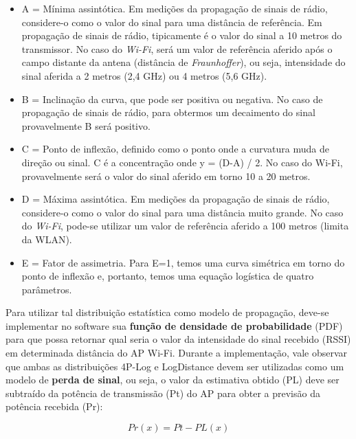 \documentclass[
	12pt,				%
	openright,			%
	twoside,			%
	a4paper,			%
	english,			%
	french,				%
	spanish,			%
	brazil				%
	]{abntex2}
\begin{document}
\begin{itemize}
	\item A = Mínima assintótica. Em medições da propagação de sinais de rádio, considere-o como o valor do sinal para uma distância de referência. Em propagação de sinais de rádio, tipicamente é o valor do sinal a 10 metros do transmissor. No caso do \textit{Wi-Fi}, será um valor de referência aferido após o campo distante da antena (distância de \textit{Fraunhoffer}), ou seja, intensidade do sinal aferida a 2 metros (2,4 GHz) ou 4 metros (5,6 GHz).
	
	\item B = Inclinação da curva, que pode ser positiva ou negativa. No caso de propagação de sinais de rádio, para obtermos um decaimento do sinal provavelmente B será positivo. 
	
	\item C = Ponto de inflexão, definido como o ponto onde a curvatura muda de direção ou sinal. C é a concentração onde y = (D-A) / 2. No caso do Wi-Fi, provavelmente será o valor do sinal aferido em torno 10 a 20 metros. 
	
	\item D = Máxima assintótica. Em medições da propagação de sinais de rádio, considere-o como o valor do sinal para uma distância muito grande. No caso do \textit{Wi-Fi}, pode-se utilizar um valor de referência aferido a 100 metros (limita da WLAN).
	
	\item E = Fator de assimetria. Para E=1, temos uma curva simétrica em torno do ponto de inflexão e, portanto, temos uma equação logística de quatro parâmetros.
	
\end{itemize}

Para utilizar tal distribuição estatística como modelo de propagação, deve-se implementar no software sua \textbf{função de densidade de probabilidade} (PDF) para que possa retornar qual seria o valor da intensidade do sinal recebido (RSSI) em determinada distância do AP Wi-Fi. Durante a implementação, vale observar que ambas as distribuições 4P-Log e LogDistance devem ser utilizadas como um modelo de \textbf{perda de sinal}, ou seja, o valor da estimativa obtido (PL) deve ser subtraído da potência de transmissão (Pt) do AP para obter a previsão da potência recebida (Pr):

\begin{equation}
Pr(x) = Pt - PL(x)
\end{equation}
\end{document}
